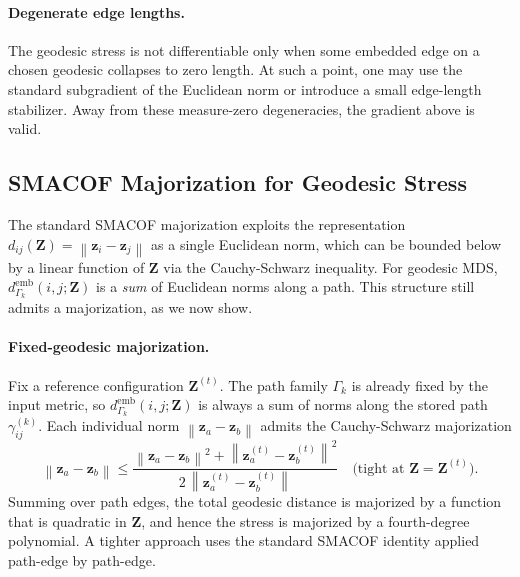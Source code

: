 \documentclass[twoside,11pt]{article}
\newcommand{\bz}{\mathbf{z}}
\newcommand{\bZ}{\mathbf{Z}}
\newcommand{\norm}[1]{\left\|#1\right\|}
\newcommand{\demb}{d^{\mathrm{emb}}}
\begin{document}
\paragraph{Degenerate edge lengths.}
The geodesic stress is not differentiable only when some embedded edge on
a chosen geodesic collapses to zero length.  At such a point, one may use
the standard subgradient of the Euclidean norm or introduce a small
edge-length stabilizer.  Away from these measure-zero degeneracies, the
gradient above is valid.

\subsection{SMACOF Majorization for Geodesic Stress}
\label{sec:geo_smacof}

The standard SMACOF majorization exploits the representation
$d_{ij}(\bZ) = \norm{\bz_i - \bz_j}$ as a single Euclidean norm, which
can be bounded below by a linear function of $\bZ$ via the Cauchy-Schwarz
inequality.  For geodesic MDS, $\demb_{\Gamma_k}(i,j;\bZ)$ is a \emph{sum} of
Euclidean norms along a path.  This structure still admits a majorization,
as we now show.

\paragraph{Fixed-geodesic majorization.}
Fix a reference configuration $\bZ^{(t)}$.  The path family $\Gamma_k$ is
already fixed by the input metric, so $\demb_{\Gamma_k}(i,j;\bZ)$ is always a sum
of norms along the stored path $\gamma_{ij}^{(k)}$.  Each
individual norm $\norm{\bz_a - \bz_b}$ admits the Cauchy-Schwarz majorization
\begin{equation}
  \norm{\bz_a - \bz_b}
  \leq
  \frac{\norm{\bz_a - \bz_b}^2 + \norm{\bz^{(t)}_a - \bz^{(t)}_b}^2}
       {2\,\norm{\bz^{(t)}_a - \bz^{(t)}_b}}
  \quad \text{(tight at } \bZ = \bZ^{(t)}\text{)}.
  \label{eq:cs_majorization}
\end{equation}
Summing over path edges, the total geodesic distance is majorized by a
function that is quadratic in $\bZ$, and hence the stress is majorized by
a fourth-degree polynomial.  A tighter approach uses the standard SMACOF
identity applied path-edge by path-edge.
\end{document}
